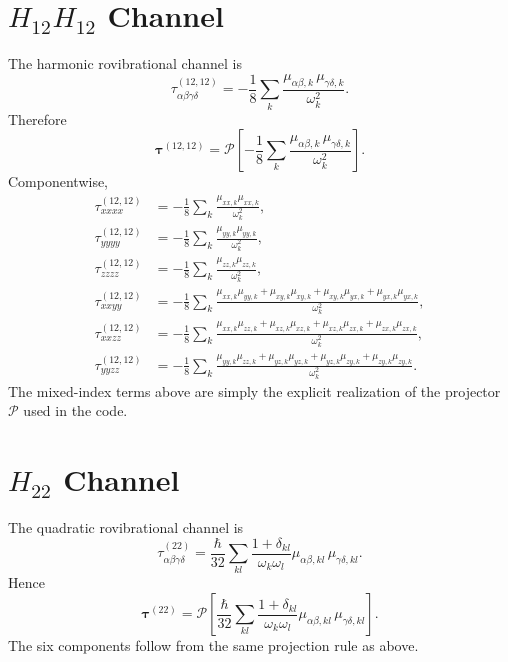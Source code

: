 \documentclass[11pt]{article}
\begin{document}
\section{$H_{12}H_{12}$ Channel}
The harmonic rovibrational channel is
\begin{equation}
\tau^{(12,12)}_{\alpha\beta\gamma\delta}
=
-\frac{1}{8}\sum_k
\frac{\mu_{\alpha\beta,k}\,\mu_{\gamma\delta,k}}{\omega_k^2}.
\end{equation}
Therefore
\begin{equation}
\bm{\tau}^{(12,12)} = \mathcal{P}\!\left[
-\frac{1}{8}\sum_k \frac{\mu_{\alpha\beta,k}\,\mu_{\gamma\delta,k}}{\omega_k^2}
\right].
\end{equation}
Componentwise,
\begin{align}
\tau^{(12,12)}_{xxxx} &= -\frac{1}{8}\sum_k \frac{\mu_{xx,k}\mu_{xx,k}}{\omega_k^2}, \\
\tau^{(12,12)}_{yyyy} &= -\frac{1}{8}\sum_k \frac{\mu_{yy,k}\mu_{yy,k}}{\omega_k^2}, \\
\tau^{(12,12)}_{zzzz} &= -\frac{1}{8}\sum_k \frac{\mu_{zz,k}\mu_{zz,k}}{\omega_k^2}, \\
\tau^{(12,12)}_{xxyy} &= -\frac{1}{8}\sum_k \frac{\mu_{xx,k}\mu_{yy,k}+\mu_{xy,k}\mu_{xy,k}+\mu_{xy,k}\mu_{yx,k}+\mu_{yx,k}\mu_{yx,k}}{\omega_k^2}, \\
\tau^{(12,12)}_{xxzz} &= -\frac{1}{8}\sum_k \frac{\mu_{xx,k}\mu_{zz,k}+\mu_{xz,k}\mu_{xz,k}+\mu_{xz,k}\mu_{zx,k}+\mu_{zx,k}\mu_{zx,k}}{\omega_k^2}, \\
\tau^{(12,12)}_{yyzz} &= -\frac{1}{8}\sum_k \frac{\mu_{yy,k}\mu_{zz,k}+\mu_{yz,k}\mu_{yz,k}+\mu_{yz,k}\mu_{zy,k}+\mu_{zy,k}\mu_{zy,k}}{\omega_k^2}.
\end{align}
The mixed-index terms above are simply the explicit realization of the projector
$\mathcal{P}$ used in the code.

\section{$H_{22}$ Channel}
The quadratic rovibrational channel is
\begin{equation}
\tau^{(22)}_{\alpha\beta\gamma\delta}
=
\frac{\hbar}{32}
\sum_{kl}
\frac{1+\delta_{kl}}{\omega_k\omega_l}
\mu_{\alpha\beta,kl}\,\mu_{\gamma\delta,kl}.
\end{equation}
Hence
\begin{equation}
\bm{\tau}^{(22)} = \mathcal{P}\!\left[
\frac{\hbar}{32}
\sum_{kl}
\frac{1+\delta_{kl}}{\omega_k\omega_l}
\mu_{\alpha\beta,kl}\,\mu_{\gamma\delta,kl}
\right].
\end{equation}
The six components follow from the same projection rule as above.
\end{document}
